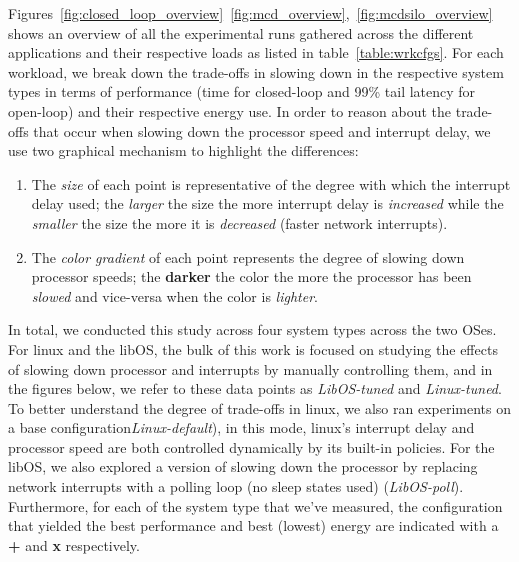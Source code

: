 \label{sec:exp}
Figures~\ref{fig:closed_loop_overview}~\ref{fig:mcd_overview},~\ref{fig:mcdsilo_overview} shows an overview of all the experimental runs gathered across the different applications and their respective loads as listed in table~\ref{table:wrkcfgs}. For each workload, we break down the trade-offs in slowing down in the respective system types in terms of performance (time for closed-loop and 99\% tail latency for open-loop) and their respective energy use. In order to reason about the trade-offs that occur when slowing down the processor speed and interrupt delay, we use two graphical mechanism to highlight the differences: 
\begin{enumerate}
    \item The \textit{size} of each point is representative of the degree with which the interrupt delay used; the {\larger[1]\textit{larger}} the size the more interrupt delay is \textit{increased} while the \textit{smaller} the size the more it is \textit{decreased} (faster network interrupts).
    \item The \textit{color gradient} of each point represents the degree of slowing down processor speeds; the \textbf{darker} the color the more the processor has been \textit{slowed} and vice-versa when the color is \textit{lighter}.
\end{enumerate}

In total, we conducted this study across four system types across the two OSes. For linux and the libOS, the bulk of this work is focused on studying the effects of slowing down processor and interrupts by manually controlling them, and in the figures below, we refer to these data points as \textit{LibOS-tuned} and \textit{Linux-tuned}. To better understand the degree of trade-offs in linux, we also ran experiments on a base configuration\textit{Linux-default}), in this mode, linux's interrupt delay and processor speed are both controlled dynamically by its built-in policies. For the libOS, we also explored a version of slowing down the processor by replacing network interrupts with a polling loop (no sleep states used) (\textit{LibOS-poll}). Furthermore, for each of the system type that we've measured, the configuration that yielded the best performance and best (lowest) energy are indicated with a {\larger[4]\textbf{+}} and {\larger[4]\textbf{x}} respectively.